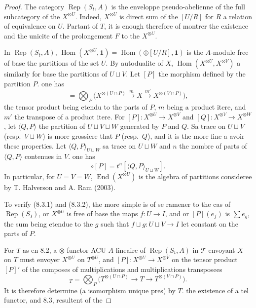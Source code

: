\documentclass[11pt,a4paper]{article}
\theoremstyle{plain}
\theoremstyle{definition}
\DeclareMathOperator{\Hom}{Hom}
\DeclareMathOperator{\End}{End}
\DeclareMathOperator{\Rep}{Rep}
\begin{document}
\begin{proof}
The category $\Rep(S_t, A)$ is the enveloppe pseudo-abelienne of the full subcategory of the $X^{\otimes U}$. Indeed, $X^{\otimes U}$ is direct sum of the $[U/R]$ for $R$ a relation of equivalence on $U$. Partant of $T$, it is enough therefore of montrer the existence and the unicite of the prolongement $F$ to the $X^{\otimes U}$.

In $\Rep(S_t, A)$, $\Hom(X^{\otimes U}, \mathbf{1}) = \Hom(\oplus [U/R], \mathbf{1})$ is the $A$-module free of base the partitions of the set $U$. By autodualite of $X$, $\Hom(X^{\otimes U}, X^{\otimes V})$ a similarly for base the partitions of $U \sqcup V$. Let $[P]$ the morphism defined by the partition $P$. one has
\begin{equation}
[P] = \bigotimes_{P} \bigl(X^{\otimes (U \cap P)} \xrightarrow{m} X \xrightarrow{m'} X^{\otimes (V \cap P)}\bigr), \tag{8.3.1}
\end{equation}
the tensor product being etendu to the parts of $P$, $m$ being a product itere, and $m'$ the transpose of a product itere. For $[P] : X^{\otimes U} \to X^{\otimes V}$ and $[Q] : X^{\otimes V} \to X^{\otimes W}$, let $\langle Q, P \rangle$ the partition of $U \sqcup V \sqcup W$ generated by $P$ and $Q$. Sa trace on $U \sqcup V$ (resp.~$V \sqcup W$) is more grossiere that $P$ (resp.~$Q$), and it is the more fine a avoir these properties. Let $\langle Q, P \rangle_{U \sqcup W}$ sa trace on $U \sqcup W$ and $n$ the nombre of parts of $\langle Q, P \rangle$ contenues in $V$. one has
\begin{equation}
[Q] \circ [P] = t^n [\langle Q, P \rangle_{U \sqcup W}]. \tag{8.3.2}
\end{equation}
In particular, for $U = V = W$, $\End(X^{\otimes U})$ is the algebra of partitions consideree by T. Halverson and A. Ram (2003).

To verify (8.3.1) and (8.3.2), the more simple is of se ramener to the cas of $\Rep(S_I)$, or $X^{\otimes U}$ is free of base the maps $f : U \to I$, and or $[P](e_f)$ is $\sum e_g$, the sum being etendue to the $g$ such that $f \sqcup g : U \sqcup V \to I$ let constant on the parts of $P$.

For $T$ as en 8.2, a $\otimes$-functor ACU $A$-lineaire of $\Rep(S_t, A)$ in $\mathcal{T}$ envoyant $X$ on $T$ must envoyer $X^{\otimes U}$ on $T^{\otimes U}$, and $[P] : X^{\otimes U} \to X^{\otimes V}$ on the tensor product $[P]'$ of the composes of multiplications and multiplications transposees
\begin{equation}
[P]_T = \bigotimes_{P} \bigl(T^{\otimes (U \cap P)} \to T \to T^{\otimes (V \cap P)}\bigr). \tag{8.3.3}
\end{equation}
It is therefore determine (a isomorphism unique pres) by $T$. the existence of a tel functor, and 8.3, resultent of the
\end{proof}
\end{document}
